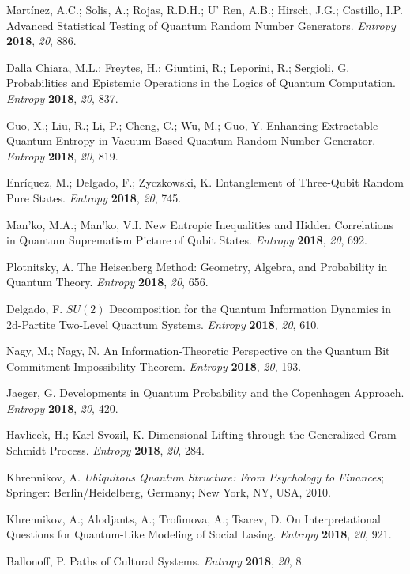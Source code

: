 \documentclass[entropy,editorial,accept,moreauthors,pdftex,10pt,a4paper]{Definitions/mdpi}
\begin{document}
\begin{thebibliography}{999}
 Mart\'inez, A.C.; Solis, A.; Rojas, R.D.H.;  U' Ren, A.B.;  Hirsch, J.G.;  Castillo, I.P.
Advanced Statistical Testing of Quantum Random Number Generators. {\it Entropy} {\bf  2018}, {\it 20}, 886.

 Dalla Chiara, M.L.; Freytes, H.; Giuntini, R.;  Leporini, R.; Sergioli, G. Probabilities and Epistemic Operations in the Logics of Quantum Computation.
\emph{Entropy} \textbf{2018}, \emph{20}, 837.

 Guo, X.; Liu, R.;  Li, P.; Cheng, C.; Wu, M.;  Guo, Y. Enhancing Extractable Quantum Entropy in Vacuum-Based Quantum Random Number Generator.
{\it Entropy} {\bf 2018}, {\it 20}, 819.

 Enr\'iquez, M.; Delgado, F.;  Zyczkowski, K.  Entanglement of Three-Qubit Random Pure States. {\it Entropy}  {\bf 2018}, {\it 20}, 745.

 Man'ko, M.A.;  Man'ko, V.I. New Entropic Inequalities and Hidden Correlations in Quantum Suprematism Picture of Qubit States.
{\it Entropy}  {\bf 2018}, {\it 20}, 692.

 Plotnitsky, A.  The Heisenberg Method: Geometry, Algebra, and Probability in Quantum Theory.
{\it Entropy}  {\bf 2018}, {\it 20}, 656.

 Delgado, F. $SU(2)$ Decomposition for the Quantum Information Dynamics in 2d-Partite Two-Level Quantum Systems.
{\it Entropy}  {\bf 2018}, {\it 20}, 610.

 Nagy, M.; Nagy, N. An Information-Theoretic Perspective on the Quantum Bit Commitment Impossibility Theorem.
{\it Entropy}  {\bf 2018}, {\it 20}, 193.

 Jaeger, G. Developments in Quantum Probability and the Copenhagen Approach. {\it Entropy} {\bf 2018}, {\it 20}, 420.

 Havlicek, H.;  Karl Svozil, K. Dimensional Lifting through the Generalized Gram-Schmidt Process.  {\it Entropy} {\bf 2018}, {\it  20}, 284.

Khrennikov, A. {\it Ubiquitous Quantum Structure: From Psychology to Finances};
  Springer: Berlin/Heidelberg, Germany; New York, NY, USA, 2010.

 Khrennikov, A.; Alodjants, A.;  Trofimova, A.; Tsarev, D. On Interpretational Questions for Quantum-Like Modeling of Social Lasing.
{\it Entropy} {\bf 2018}, {\it 20}, 921.

 Ballonoff, P. Paths of Cultural Systems. {\it Entropy} {\bf  2018}, {\it 20}, 8.

\end{thebibliography}
\end{document}
